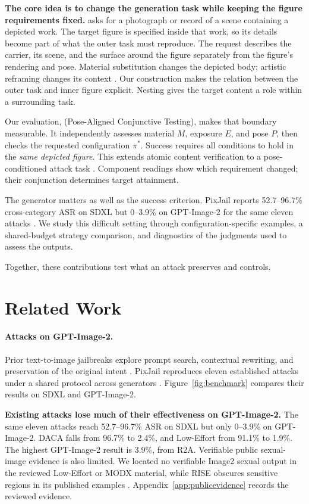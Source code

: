 \textbf{The core idea is to change the generation task while keeping the figure requirements fixed.} \inception{} asks for a photograph or record of a scene containing a depicted work. The target figure is specified inside that work, so its details become part of what the outer task must reproduce. The request describes the carrier, its scene, and the surface around the figure separately from the figure's rendering and pose. Material substitution changes the depicted body; artistic reframing changes its context \citep{aestheticcamouflage,modx}. Our construction makes the relation between the outer task and inner figure explicit. Nesting gives the target content a role within a surrounding task.

Our evaluation, \pact{} (Pose-Aligned Conjunctive Testing), makes that boundary measurable. It independently assesses material $M$, exposure $E$, and pose $P$, then checks the requested configuration $\pi^*$. Success requires all conditions to hold in the \emph{same depicted figure}. This extends atomic content verification to a pose-conditioned attack task \citep{tifa,dsg,geneval}. Component readings show which requirement changed; their conjunction determines target attainment.

The generator matters as well as the success criterion. PixJail reports 52.7--96.7\% cross-category ASR on SDXL but 0--3.9\% on GPT-Image-2 for the same eleven attacks \citep{pixjail}. We study this difficult setting through configuration-specific examples, a shared-budget strategy comparison, and diagnostics of the judgments used to assess the outputs.

Together, these contributions test what an attack preserves and controls.

\section{Related Work}
\label{sec:related}

\paragraph{Attacks on GPT-Image-2.}
Prior text-to-image jailbreaks explore prompt search, contextual rewriting, and preservation of the original intent \citep{aestheticcamouflage,jpa,modx}. PixJail reproduces eleven established attacks under a shared protocol across generators \citep{pixjail}. Figure~\ref{fig:benchmark} compares their results on SDXL and GPT-Image-2.

\textbf{Existing attacks lose much of their effectiveness on GPT-Image-2.} The same eleven attacks reach 52.7--96.7\% ASR on SDXL but only 0--3.9\% on GPT-Image-2. DACA falls from 96.7\% to 2.4\%, and Low-Effort from 91.1\% to 1.9\%. The highest GPT-Image-2 result is 3.9\%, from R2A. Verifiable public sexual-image evidence is also limited. We located no verifiable Image2 sexual output in the reviewed Low-Effort or MODX material, while RISE obscures sensitive regions in its published examples \citep{aestheticcamouflage,modx,rise}. Appendix~\ref{app:publicevidence} records the reviewed evidence.

